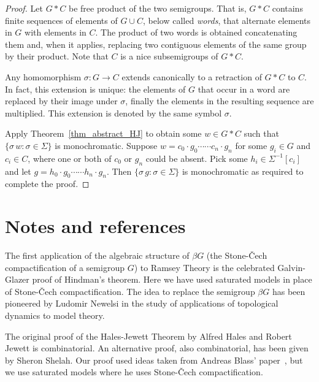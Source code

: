 \documentclass[creche.tex]{subfiles}
\begin{document}
\begin{proof}
Let $G*C$ be free product of the two semigroups.
That is, $G*C$ contains finite sequences of elements of $G\cup C$, below called \textit{words}, that alternate elements in $G$ with elements in $C$.
The product of two words is obtained concatenating them and, when it applies, replacing two contiguous elements of the same group by their product.
Note that $C$ is a nice subsemigroups of $G*C$.

Any homomorphism $\sigma:G\to C$ extends canonically to a retraction of $G*C$ to $C$.
In fact, this extension is unique: the elements of $G$ that occur in a word are replaced by their image under $\sigma$, finally the elements in the resulting sequence are multiplied.
This extension is denoted by the same symbol $\sigma$.

Apply Theorem~\ref{thm_abstract_HJ} to obtain some $w\in G*C$ such that $\{\sigma \,w:\sigma\in\Sigma\}$ is monochromatic. Suppose $w=c_0\cdot g_0\cdots\cdots c_n\cdot g_n$ for some $g_i\in G$ and $c_i\in C$, where one or both of $c_0$ or $g_n$ could be absent. Pick some $h_i\in\Sigma^{-1}[c_i]$ and let $g=h_0\cdot g_0\cdots\cdots h_n\cdot g_n$. Then $\{\sigma\,g:\sigma\in\Sigma\}$ is monochromatic as required to complete the proof.
\end{proof}







\section{Notes and references}

The first application of the algebraic structure of $\beta G$ 
(the Stone-\v{C}ech compactification of a semigroup $G$) 
to Ramsey Theory is the celebrated Galvin-Glazer proof of Hindman's theorem. 
Here we have used saturated models in place of Stone-\v{C}ech compactification.
The idea to replace the semigroup $\beta G$  has been pioneered by Ludomir Newelsi
in the study of applications of topological dynamics to model theory. 

The original proof of the Hales-Jewett Theorem by Alfred Hales and Robert Jewett is combinatorial.
An alternative proof, also combinatorial, has been given by Sheron Shelah.
Our proof used ideas taken from Andreas Blass' paper~\cite{Blass}, but we use saturated models where he uses Stone-\v{C}ech compactification.


\begin{biblist}[]\normalsize


\end{biblist}
\end{document}
